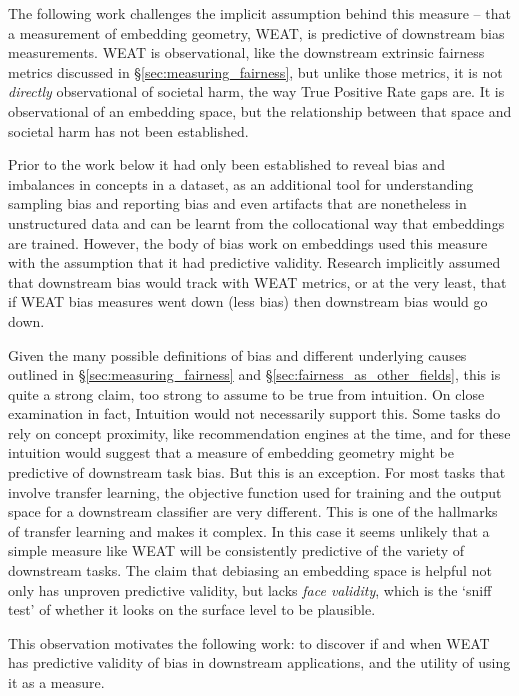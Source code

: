 The following work challenges the implicit assumption behind this measure -- that a measurement of embedding geometry, WEAT, is predictive of downstream bias measurements.
WEAT is observational, like the downstream extrinsic fairness metrics discussed in \S \ref{sec:measuring_fairness}, but unlike those metrics, it is not \textit{directly} observational of societal harm, the way True Positive Rate gaps are. It is observational of an embedding space, but the relationship between that space and societal harm has not been established. 

Prior to the work below it had only been established to reveal bias and imbalances in concepts in a dataset, as an additional tool for understanding sampling bias and reporting bias and even artifacts that are nonetheless in unstructured data and can be learnt from the collocational way that embeddings are trained. However, the body of bias work on embeddings used this measure with the assumption that it had predictive validity. Research implicitly assumed that downstream bias would track with WEAT metrics, or at the very least, that if WEAT bias measures went down (less bias) then downstream bias would go down.

Given the many possible definitions of bias and different underlying causes outlined in \S \ref{sec:measuring_fairness} and \S \ref{sec:fairness_as_other_fields}, this is quite a strong claim, too strong to assume to be true from intuition. On close examination in fact, Intuition would not necessarily support this. Some tasks do rely on concept proximity, like recommendation engines at the time, and for these intuition would suggest that a measure of embedding geometry might be predictive of downstream task bias. But this is an exception. For most tasks that involve transfer learning, the objective function used for training and the output space for a downstream classifier are very different. This is one of the hallmarks of transfer learning and makes it complex. In this case it seems unlikely that a simple measure like WEAT will be consistently predictive of the variety of downstream tasks.
The claim that debiasing an embedding space is helpful not only has unproven predictive validity, but lacks \textit{face validity}, which is the `sniff test' of whether it looks on the surface level to be plausible.  

This observation motivates the following work: to discover if and when WEAT has predictive validity of bias in downstream applications, and the utility of using it as a measure.  